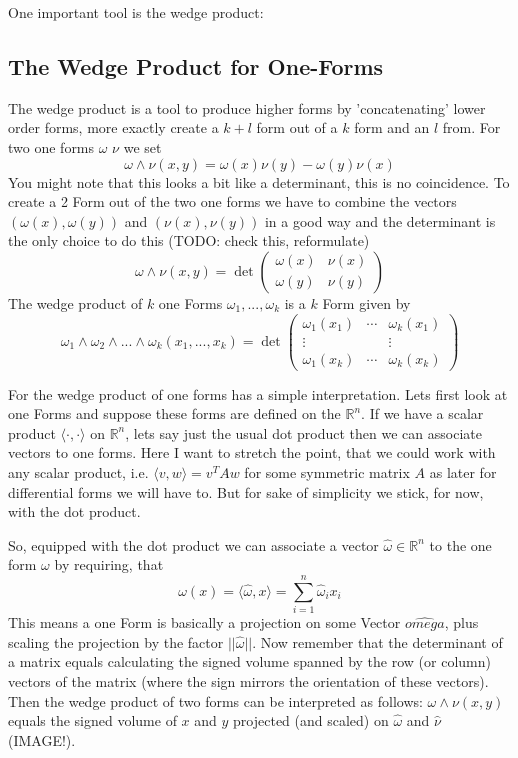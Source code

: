 One important tool is the wedge product:

\subsection{The Wedge Product for One-Forms}
The wedge product is a tool to produce higher forms by 'concatenating' lower order forms, more exactly create a $k+l$ form out of a $k$ form and an $l$ from. For two one forms $\omega$ $\nu$ we set
\[\omega \wedge \nu (x,y) = \omega(x)\nu(y) - \omega(y) \nu(x)\]
You might note that this looks a bit like a determinant, this is no coincidence. To create a 2 Form out of the two one forms we have to combine the vectors $(\omega(x), \omega(y))$ and $(\nu(x),\nu(y))$ in a good way and the determinant is the only choice to do this (TODO: check this, reformulate)
\[\omega \wedge \nu (x,y) = \det \begin{pmatrix} \omega(x) & \nu(x) \\ \omega(y) & \nu(y)\end{pmatrix}\]
The wedge product of $k$ one Forms $\omega_1,...,\omega_k$ is a $k$ Form given by
\[\omega_1 \wedge \omega_2\wedge...\wedge \omega_k (x_1,...,x_k) = \det \begin{pmatrix} 
\omega_1(x_1) &  \cdots & \omega_k(x_1) \\ 
\vdots & & \vdots\\
\omega_1(x_k) & \cdots &\omega_k(x_k)\end{pmatrix}\]

For the wedge product of one forms has a simple interpretation. Lets first look at one Forms and suppose these forms are defined on the $\mathbb R^n$. If we have a scalar product $\langle\cdot,\cdot\rangle$ on $\mathbb R^n$, lets say just the usual dot product then we can associate vectors to one forms. Here I want to stretch the point, that we could work with any scalar product, i.e. $\langle v, w \rangle = v^T A w$ for some symmetric matrix $A$ as later for differential forms we will have to. But for sake of simplicity we stick, for now, with the dot product.

So, equipped with the dot product we can associate a vector $\hat{\omega} \in \mathbb R^n$ to the one form $\omega$ by requiring, that
\[\omega(x) = \langle \hat{\omega}, x\rangle = \sum_{i=1}^n \hat{\omega}_i x_i\]
This means a one Form is basically a projection on some Vector $\hat{omega}$, plus scaling the projection by the factor $||\hat{\omega}||$. Now remember that the determinant of a matrix equals calculating the signed volume spanned by the row (or column) vectors of the matrix (where the sign mirrors the orientation of these vectors). Then the wedge product of two forms can be interpreted as follows: $\omega \wedge \nu (x,y)$ equals the signed volume of $x$ and $y$ projected (and scaled) on $\hat{\omega}$ and $\hat{\nu}$ (IMAGE!).


